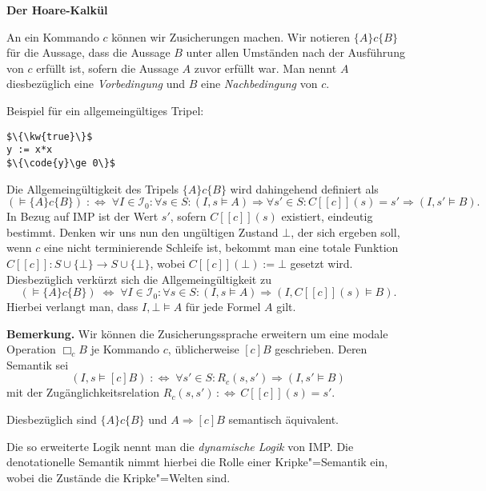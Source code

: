 \documentclass[8pt,fleqn,aspectratio=169]{beamer}
\newcommand{\strong}[1]{\textsf{\textbf{#1}}}
\newcommand{\centerheadline}[1]{%
  \begin{center}\strong{#1}\end{center}}
\newcommand{\parspace}{\vspace{0.8em}}
\newcommand{\kw}[1]{\textbf{\texttt{#1}}}
\newcommand{\code}[1]{{\texttt{#1}}}
\newcommand{\qb}[1]{[\!\![#1]\!\!]}
\begin{document}
\begin{frame}
\centerheadline{Der Hoare-Kalkül}
\end{frame}

\begin{frame}[fragile]
An ein Kommando $c$ können wir Zusicherungen machen. Wir notieren
$\{A\}c\{B\}$ für die Aussage, dass die Aussage $B$ unter allen Umständen
nach der Ausführung von $c$ erfüllt ist, sofern die Aussage $A$ zuvor
erfüllt war. Man nennt $A$ diesbezüglich eine \emph{Vorbedingung}
und $B$ eine \emph{Nachbedingung} von $c$.\pause

\parspace
Beispiel für ein allgemeingültiges Tripel:
\begin{lstlisting}[language=IMP, xleftmargin=\mathindent, mathescape]
$\{\kw{true}\}$
y := x*x
$\{\code{y}\ge 0\}$
\end{lstlisting}
\end{frame}

\begin{frame}
Die Allgemeingültigkeit des Tripels $\{A\}c\{B\}$ wird dahingehend
definiert als
\[(\models\{A\}c \{B\}) \;:\Leftrightarrow\; \forall I\in\mathcal I_0\colon\forall s\in S\colon
(I,s\models A)\Rightarrow\forall s'\in S\colon C\qb{c}(s)=s'\Rightarrow (I,s'\models B).\]\pause
{\footnotesize In Bezug auf IMP ist der Wert $s'$,
sofern $C\qb{c}(s)$ existiert, eindeutig bestimmt.
Denken wir uns nun den ungültigen Zustand $\bot$, der sich ergeben soll,
wenn $c$ eine nicht terminierende Schleife ist, bekommt man eine totale Funktion
$C\qb{c}\colon S\cup\{\bot\}\to S\cup\{\bot\}$, wobei $C\qb{c}(\bot):=\bot$
gesetzt wird. Diesbezüglich verkürzt sich die Allgemeingültigkeit zu
\[(\models\{A\}c \{B\}) \;\Leftrightarrow\; \forall I\in\mathcal I_0\colon\forall s\in S\colon
(I,s\models A)\Rightarrow (I,C\qb{c}(s)\models B).\]
Hierbei verlangt man, dass $I,\bot\models A$ für jede Formel $A$ gilt.}
\end{frame}

\begin{frame}
\strong{Bemerkung.}
Wir können die Zusicherungssprache erweitern um eine modale Operation
$\Box_c B$ je Kommando $c$, üblicherweise $[c]B$ geschrieben.\pause{} Deren Semantik sei
\[(I,s\models [c]B) \;:\Leftrightarrow\; \forall s'\in S\colon R_c(s,s')\Rightarrow (I,s'\models B)\]
mit der Zugänglichkeitsrelation $R_c(s,s')\,:\Leftrightarrow\, C\qb{c}(s)=s'$.\pause

\parspace
Diesbezüglich sind $\{A\}c\{B\}$ und $A\Rightarrow [c]B$ semantisch äquivalent.\pause

\parspace
Die so erweiterte Logik nennt man die \emph{dynamische Logik} von IMP.
Die denotationelle Semantik nimmt hierbei die Rolle einer Kripke"=Semantik
ein, wobei die Zustände die Kripke"=Welten sind.
\end{frame}
\end{document}
